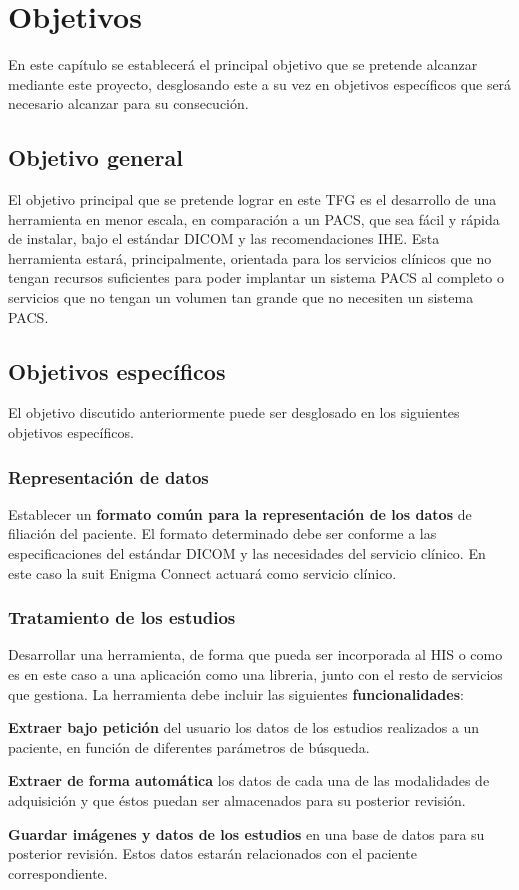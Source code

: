 \chapter{Objetivos}
\label{chap:objetivos}

\noindent

En este capítulo se establecerá el principal objetivo que se pretende alcanzar mediante este proyecto, desglosando este a su vez en objetivos específicos que será necesario alcanzar para su consecución.

\section{Objetivo general}

El objetivo principal que se pretende lograr en este \acs{TFG} es el desarrollo de una herramienta en menor escala, en comparación a un \acs{PACS}, que sea fácil y rápida de instalar, bajo el estándar \acs{DICOM} y las recomendaciones \acs{IHE}. Esta herramienta estará, principalmente, orientada para los servicios clínicos que no tengan recursos suficientes para poder implantar un sistema \acs{PACS} al completo o servicios que no tengan un volumen tan grande que no necesiten un sistema \acs{PACS}.

\section{Objetivos específicos}

El objetivo discutido anteriormente puede ser desglosado en los siguientes objetivos específicos.

\subsection{Representación de datos}
Establecer un \textbf{formato común para la representación de los datos} de filiación del paciente. El formato determinado debe ser conforme a las especificaciones del estándar \acs{DICOM} y las necesidades del servicio clínico. En este caso la suit Enigma Connect actuará como servicio clínico.

\subsection{Tratamiento de los estudios}
Desarrollar una herramienta, de forma que pueda ser incorporada al HIS o como es en este caso a una aplicación como una libreria, junto con el resto de servicios que gestiona. La herramienta debe incluir las siguientes \textbf{funcionalidades}:
\begin{definitionlist}
\item \textbf{Extraer bajo petición} del usuario los datos de los estudios realizados a un paciente, en función de diferentes parámetros de búsqueda.
\item \textbf{Extraer de forma automática} los datos de cada una de las modalidades de adquisición y que éstos puedan ser almacenados para su posterior revisión.
\item \textbf{Guardar imágenes y datos de los estudios} en una base de datos para su posterior revisión. Estos datos estarán relacionados con el paciente correspondiente.
\end{definitionlist}
